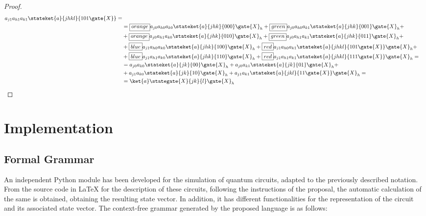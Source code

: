 \documentclass[sigconf,natbib=false]{acmart}
\begin{document}
\begin{proof}
\begin{align*}
		a_{j1}a_{h1}a_{k1}\stateket{a}{jhkl}{101\gate{X}}=\\
		&=\boxed{orange}{a_{j0}a_{h0}a_{k0}\stateket{a}{jhk}{000}\gate{X}_h}+
		\boxed{green}{a_{j0}a_{h0}a_{k1}\stateket{a}{jhk}{001}\gate{X}_h}+\\
		&+\boxed{orange}{a_{j0}a_{h1}a_{k0}\stateket{a}{jhk}{010}\gate{X}_h}+
		\boxed{green}{a_{j0}a_{h1}a_{k1}\stateket{a}{jhk}{011}\gate{X}_h}+\\
		&+\boxed{blue}{a_{j1}a_{h0}a_{k0}\stateket{a}{jhk}{100}\gate{X}_h}+
		\boxed{red}{a_{j1}a_{h0}a_{k1}\stateket{a}{jhkl}{101\gate{X}}\gate{X}_h}+\\
		&+\boxed{blue}{a_{j1}a_{h1}a_{k0}\stateket{a}{jhk}{110}\gate{X}_h}+
		\boxed{red}{a_{j1}a_{h1}a_{k1}\stateket{a}{jhkl}{111\gate{X}}\gate{X}_h}=\\
		&=a_{j0}a_{k0}\stateket{a}{jk}{00}\gate{X}_h+
		a_{j0}a_{k1}\stateket{a}{jk}{01}\gate{X}_h+\\
		&+a_{j1}a_{k0}\stateket{a}{jk}{10}\gate{X}_h+
		a_{j1}a_{k1}\stateket{a}{jkl}{11\gate{X}}\gate{X}_h=\\
&=\ket{a}\stategate{X}{jk}{l}\gate{X}_h
\end{align*}
\end{proof}

\section{Implementation}
\subsection{Formal Grammar}
An independent Python module has been developed for the simulation of quantum circuits, adapted to the previously described notation. From the source code in \LaTeX{} for the description of these circuits, following the instructions of the proposal, the automatic calculation of the same is obtained, obtaining the resulting state vector. In addition, it has different functionalities for the representation of the circuit and its associated state vector. The context-free grammar generated by the proposed language is as follows:
\end{document}
